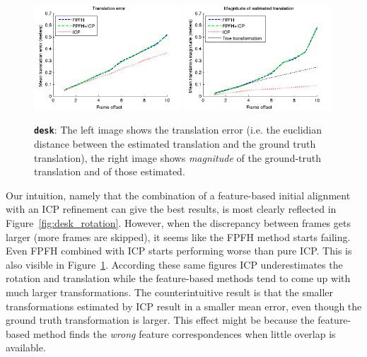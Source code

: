 \documentclass[a4paper]{article}
\begin{document}
\begin{figure}[H]
    \centering
        \includegraphics[width=0.49\textwidth]{ims/deskTranslationerror.png}
        \includegraphics[width=0.49\textwidth]{ims/deskMagnitudeofestimatedtranslation.png}
    \caption{\textbf{\texttt{desk}}: The left image shows the translation error (i.e. the euclidian distance between the estimated translation and the ground truth translation), the right image shows \emph{magnitude} of the ground-truth translation and of those estimated.}
    \label{fig:desk_translation}
\end{figure}

Our intuition, namely that the combination of a feature-based initial alignment with an \ac{ICP} refinement can give the best results, is most clearly reflected in Figure~\ref{fig:desk_rotation}. However, when the discrepancy between frames gets larger (more frames are skipped), it seems like the \ac{FPFH} method starts failing. Even \ac{FPFH} combined with \ac{ICP} starts performing worse than pure \ac{ICP}. This is also visible in Figure~\ref{fig:desk_translation}. According these same figures \ac{ICP} underestimates the rotation and translation while the feature-based methods tend to come up with much larger transformations. The counterintuitive result is that the smaller transformations estimated by \ac{ICP} result in a smaller mean error, even though the ground truth transformation is larger. This effect might be because the feature-based method finds the \emph{wrong} feature correspondences when little overlap is available.
\end{document}
